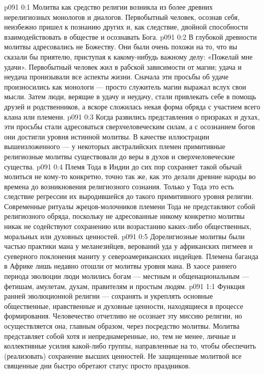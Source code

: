 \vs p091 0:1 Молитва как средство религии возникла из более древних нерелигиозных монологов и диалогов. Первобытный человек, осознав себя, неизбежно пришел к познанию других и, как следствие, двойной способности взаимодействовать в обществе и осознавать Бога.
\vs p091 0:2 В глубокой древности молитвы адресовались не Божеству. Они были очень похожи на то, что вы сказали бы приятелю, приступая к какому\hyp{}нибудь важному делу: «Пожелай мне удачи». Первобытный человек жил в рабской зависимости от магии; удача и неудача пронизывали все аспекты жизни. Сначала эти просьбы об удаче произносились как монологи --- просто служитель магии выражал вслух свои мысли. Затем люди, верящие в удачу и неудачу, стали привлекать себе в помощь друзей и родственников, а вскоре сложилась некая форма обряда с участием всего клана или племени.
\vs p091 0:3 Когда развились представления о призраках и духах, эти просьбы стали адресоваться сверхчеловеческим силам, а с осознанием богов они достигли уровня истинной молитвы. В качестве иллюстрации вышеизложенного --- у некоторых австралийских племен примитивные религиозные молитвы существовали до веры в духов и сверхчеловеческие существа.
\vs p091 0:4 Племя Тода в Индии до сих пор сохраняет такой обычай молиться не кому\hyp{}то конкретно, точно так же, как это делали древние народы во времена до возникновения религиозного сознания. Только у Тода это есть следствие регрессии их выродившейся до такого примитивного уровня религии. Современные ритуалы жрецов\hyp{}молочников племени Тода не представляют собой религиозного обряда, поскольку не адресованные никому конкретно молитвы никак не содействуют сохранению или возрастанию каких\hyp{}либо общественных, моральных или духовных ценностей.
\vs p091 0:5 Дорелигиозные молитвы были частью практики мана у меланезийцев, верований уда у африканских пигмеев и суеверного поклонения маниту у североамериканских индейцев. Племена баганда в Африке лишь недавно отошли от молитвы уровня мана. В хаосе раннего периода эволюции люди молились богам --- местным и общенациональным --- фетишам, амулетам, духам, правителям и простым людям.
\vs p091 1:1 Функция ранней эволюционной религии --- сохранять и укреплять основные общественные, нравственные и духовные ценности, находящиеся в процессе формирования. Человечество отчетливо не осознает эту миссию религии, но осуществляется она, главным образом, через посредство молитвы. Молитва представляет собой хотя и непреднамеренные, но, тем не менее, личные и коллективные усилия какой\hyp{}либо группы, направленные на то, чтобы обеспечить (реализовать) сохранение высших ценностей. Не защищенные молитвой все священные дни быстро обретают статус просто праздников.
